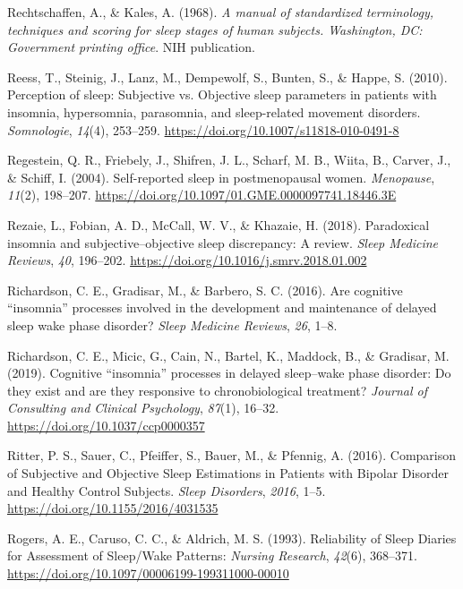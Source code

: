 \documentclass[
]{article}
\newlength{\cslhangindent}
\newenvironment{CSLReferences}[2] %
 {\begin{list}{}{%
  \setlength{\itemindent}{0pt}
  \setlength{\leftmargin}{0pt}
  \setlength{\parsep}{0pt}
  \ifodd #1
   \setlength{\leftmargin}{\cslhangindent}
   \setlength{\itemindent}{-1\cslhangindent}
  \fi
  \setlength{\itemsep}{#2\baselineskip}}}
 {\end{list}}
\begin{document}
\begin{CSLReferences}{1}{0}
Rechtschaffen, A., \& Kales, A. (1968). \emph{A manual of standardized terminology, techniques and scoring for sleep stages of human subjects. Washington, DC: Government printing office}. NIH publication.

Reess, T., Steinig, J., Lanz, M., Dempewolf, S., Bunten, S., \& Happe, S. (2010). Perception of sleep: {Subjective} vs. Objective sleep parameters in patients with insomnia, hypersomnia, parasomnia, and sleep-related movement disorders. \emph{Somnologie}, \emph{14}(4), 253--259. \url{https://doi.org/10.1007/s11818-010-0491-8}

Regestein, Q. R., Friebely, J., Shifren, J. L., Scharf, M. B., Wiita, B., Carver, J., \& Schiff, I. (2004). Self-reported sleep in postmenopausal women. \emph{Menopause}, \emph{11}(2), 198--207. \url{https://doi.org/10.1097/01.GME.0000097741.18446.3E}

Rezaie, L., Fobian, A. D., McCall, W. V., \& Khazaie, H. (2018). {Paradoxical insomnia and subjective--objective sleep discrepancy: A review}. \emph{Sleep Medicine Reviews}, \emph{40}, 196--202. \url{https://doi.org/10.1016/j.smrv.2018.01.002}

Richardson, C. E., Gradisar, M., \& Barbero, S. C. (2016). Are cognitive {``insomnia''} processes involved in the development and maintenance of delayed sleep wake phase disorder? \emph{Sleep Medicine Reviews}, \emph{26}, 1--8.

Richardson, C. E., Micic, G., Cain, N., Bartel, K., Maddock, B., \& Gradisar, M. (2019). Cognitive {``insomnia''} processes in delayed sleep--wake phase disorder: {Do} they exist and are they responsive to chronobiological treatment? \emph{Journal of Consulting and Clinical Psychology}, \emph{87}(1), 16--32. \url{https://doi.org/10.1037/ccp0000357}

Ritter, P. S., Sauer, C., Pfeiffer, S., Bauer, M., \& Pfennig, A. (2016). Comparison of {Subjective} and {Objective} {Sleep} {Estimations} in {Patients} with {Bipolar} {Disorder} and {Healthy} {Control} {Subjects}. \emph{Sleep Disorders}, \emph{2016}, 1--5. \url{https://doi.org/10.1155/2016/4031535}

Rogers, A. E., Caruso, C. C., \& Aldrich, M. S. (1993). Reliability of {Sleep} {Diaries} for {Assessment} of {Sleep}/{Wake} {Patterns}: \emph{Nursing Research}, \emph{42}(6), 368--371. \url{https://doi.org/10.1097/00006199-199311000-00010}


\end{CSLReferences}
\end{document}
